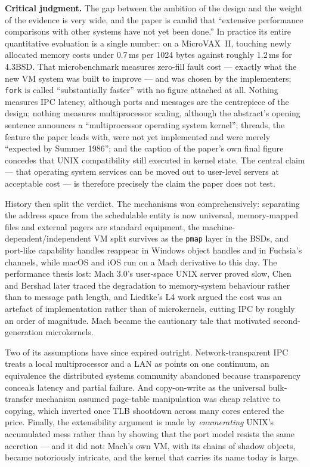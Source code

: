 \textbf{Critical judgment.} The gap between the ambition of the design and the weight of the
evidence is very wide, and the paper is candid that ``extensive performance comparisons with
other systems have not yet been done.'' In practice its entire quantitative evaluation is a
single number: on a MicroVAX~II, touching newly allocated memory costs under 0.7\,ms per
1024 bytes against roughly 1.2\,ms for 4.3BSD. That microbenchmark measures zero-fill fault
cost --- exactly what the new VM system was built to improve --- and was chosen by the
implementers; \texttt{fork} is called ``substantially faster'' with no figure attached at all.
Nothing measures IPC latency, although ports and messages are the centrepiece of the design;
nothing measures multiprocessor scaling, although the abstract's opening sentence announces a
``multiprocessor operating system kernel''; threads, the feature the paper leads with, were not yet implemented and were merely
``expected by Summer 1986''; and the caption of the paper's own final figure concedes that
UNIX compatibility still executed in kernel state. The central claim --- that operating
system services can be moved out to user-level servers at acceptable cost --- is therefore
precisely the claim the paper does not test.

History then split the verdict. The mechanisms
won comprehensively: separating the address space from the schedulable entity is now
universal, memory-mapped files and external pagers are standard equipment, the
machine-dependent/independent VM split survives as the \texttt{pmap} layer in the BSDs, and
port-like capability handles reappear in Windows object handles and in Fuchsia's channels,
while macOS and iOS run on a Mach derivative to this day. The performance thesis lost: Mach
3.0's user-space UNIX server proved slow, Chen and Bershad later traced the degradation to
memory-system behaviour rather than to message path length, and Liedtke's L4 work argued the
cost was an artefact of implementation rather than of microkernels, cutting IPC by roughly an
order of magnitude. Mach became the cautionary tale that motivated second-generation
microkernels.

Two of its assumptions have since expired outright. Network-transparent IPC
treats a local multiprocessor and a LAN as points on one continuum, an equivalence the
distributed systems community abandoned because transparency conceals latency and partial
failure. And copy-on-write as the universal bulk-transfer mechanism assumed page-table
manipulation was cheap relative to copying, which inverted once TLB shootdown across many
cores entered the price. Finally, the extensibility argument is made by \emph{enumerating}
UNIX's accumulated mess rather than by showing that the port model resists the same
accretion --- and it did not: Mach's own VM, with its chains of shadow objects, became
notoriously intricate, and the kernel that carries its name today is large.

